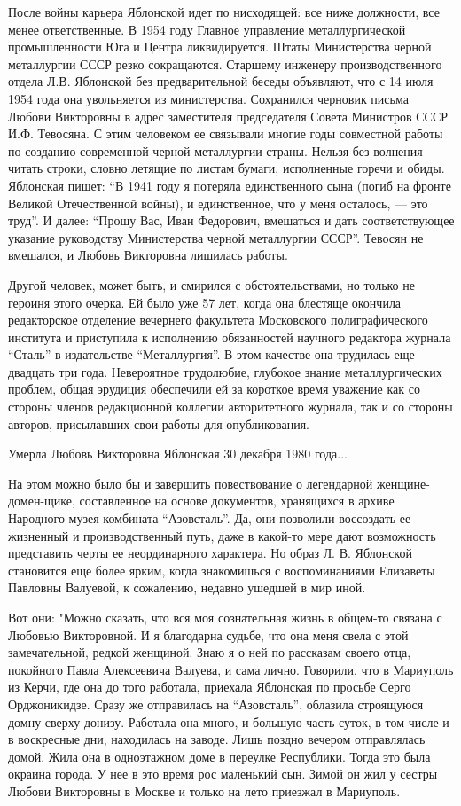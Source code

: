 После войны карьера Яблонской идет по нисходящей: все ниже должности, все менее
ответственные. В 1954 году Главное управление металлургической промышленности
Юга и Центра ликвидируется. Штаты Министерства черной металлургии СССР резко
сокращаются. Старшему инженеру производственного отдела Л.В. Яблонской без
предварительной беседы объявляют, что с 14 июля 1954 года она увольняется из
министерства. Сохранился черновик письма Любови Викторовны в адрес заместителя
председателя Совета Министров СССР И.Ф. Тевосяна. С этим человеком ее связывали
многие годы совместной работы по созданию современной черной металлургии
страны. Нельзя без волнения читать строки, словно летящие по листам бумаги,
исполненные горечи и обиды. Яблонская пишет: \enquote{В 1941 году я потеряла
единственного сына (погиб на фронте Великой Отечественной войны), и
единственное, что у меня осталось, — это труд}. И далее: \enquote{Прошу Вас, Иван
Федорович, вмешаться и дать соответствующее указание руководству Министерства
черной металлургии СССР}. Тевосян не вмешался, и Любовь Викторовна лишилась
работы.

Другой человек, может быть, и смирился с обстоятельствами, но только не героиня
этого очерка. Ей было уже 57 лет, когда она блестяще окончила редакторское
отделение вечернего факультета Московского полиграфического института и
приступила к исполнению обязанностей научного редактора журнала \enquote{Сталь} в
издательстве \enquote{Металлургия}. В этом качестве она трудилась еще двадцать три
года. Невероятное трудолюбие, глубокое знание металлургических проблем, общая
эрудиция обеспечили ей за короткое время уважение как со стороны членов
редакционной коллегии авторитетного журнала, так и со стороны авторов,
присылавших свои работы для опубликования.

Умерла Любовь Викторовна Яблонская 30 декабря 1980 года...

На этом можно было бы и завершить повествование о легендарной
женщине-домен\hyp{}щике, составленное на основе документов, хранящихся в архиве
Народного музея комбината \enquote{Азовсталь}. Да, они позволили воссоздать ее
жизненный и производственный путь, даже в какой-то мере дают возможность
представить черты ее неординарного характера. Но образ Л. В. Яблонской
становится еще более ярким, когда знакомишься с воспоминаниями Елизаветы
Павловны Валуевой, к сожалению, недавно ушедшей в мир иной.

Вот они: "Можно сказать, что вся моя сознательная жизнь в общем-то связана с
Любовью Викторовной. И я благодарна судьбе, что она меня свела с этой
замечательной, редкой женщиной. Знаю я о ней по рассказам своего отца,
покойного Павла Алексеевича Валуева, и сама лично. Говорили, что в Мариуполь из
Керчи, где она до того работала, приехала Яблонская по просьбе Серго
Орджоникидзе. Сразу же отправилась на \enquote{Азовсталь}, облазила строящуюся домну
сверху донизу. Работала она много, и большую часть суток, в том числе и в
воскресные дни, находилась на заводе. Лишь поздно вечером отправлялась домой.
Жила она в одноэтажном доме в переулке Республики. Тогда это была окраина
города. У нее в это время рос маленький сын. Зимой он жил у сестры Любови
Викторовны в Москве и только на лето приезжал в Мариуполь.

